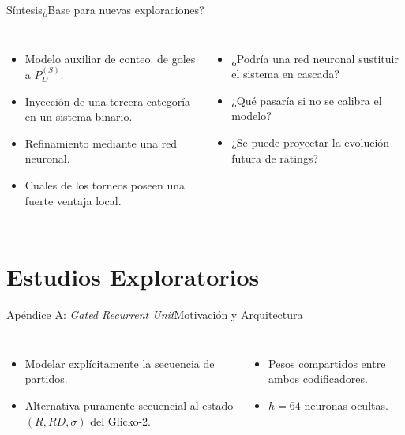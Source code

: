 \documentclass[aspectratio=169,11pt]{beamer}
\begin{document}
\begin{frame}{S\'intesis}{¿Base para nuevas exploraciones?}
	\vspace*{-6mm}
	\begin{columns}[T,onlytextwidth]
		\par\vskip 2mm
		\footnotesize
		\begin{itemize}
			\item Modelo auxiliar de conteo: de goles a $P_{D}^{(S)}$.
			\item Inyecci\'on de una tercera categor\'ia en un sistema binario.
			\item Refinamiento mediante una red neuronal.
			\item Cuales de los torneos poseen una fuerte ventaja local.
		\end{itemize}
		\par\vskip 2mm
		\footnotesize
		\begin{itemize}
			\item ¿Podr\'ia una red neuronal sustituir el sistema en cascada?
			\item ¿Qu\'e pasar\'ia si no se calibra el modelo?
			\item ¿Se puede proyectar la evoluci\'on futura de ratings?
		\end{itemize}
	\end{columns}
\end{frame}
\section{Estudios Exploratorios}

\begin{frame}{Ap\'endice A: \textit{Gated Recurrent Unit}}{Motivaci\'on y Arquitectura}
	\begin{columns}[T,onlytextwidth]
		\par\vskip 2mm
		\footnotesize
		\begin{itemize}
			\item Modelar expl\'icitamente la secuencia de partidos.
			\item Alternativa puramente secuencial al estado $(R, RD, \sigma)$ del Glicko-2.
		\end{itemize}
		\par\vskip 2mm
		\footnotesize
		\begin{itemize}
			\item Pesos compartidos entre ambos codificadores.
			\item $h = 64$ neuronas ocultas.
		\end{itemize}
	\end{columns}
\end{frame}
\end{document}
